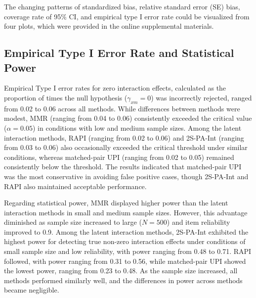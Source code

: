 \documentclass[
  man,mask]{apa6}
\begin{document}
The changing patterns of standardized bias, relative standard error (SE) bias, coverage rate of 95\% CI, and empirical type I error rate could be visualized from four plots, which were provided in the online supplemental materials.

\subsection{Empirical Type I Error Rate and Statistical Power}\label{empirical-type-i-error-rate-and-statistical-power-1}

Empirical Type I error rates for zero interaction effects, calculated as the proportion of times the null hypothesis (\(\gamma_{xm} = 0\)) was incorrectly rejected, ranged from 0.02 to 0.06 across all methods. While differences between methods were modest, MMR (ranging from 0.04 to 0.06) consistently exceeded the critical value (\(\alpha = 0.05\)) in conditions with low and medium sample sizes. Among the latent interaction methods, RAPI (ranging from 0.02 to 0.06) and 2S-PA-Int (ranging from 0.03 to 0.06) also occasionally exceeded the critical threshold under similar conditions, whereas matched-pair UPI (ranging from 0.02 to 0.05) remained consistently below the threshold. The results indicated that matched-pair UPI was the most conservative in avoiding false positive cases, though 2S-PA-Int and RAPI also maintained acceptable performance.

Regarding statistical power, MMR displayed higher power than the latent interaction methods in small and medium sample sizes. However, this advantage diminished as sample size increased to large (\(\textit{N} = 500\)) and item reliability improved to 0.9. Among the latent interaction methods, 2S-PA-Int exhibited the highest power for detecting true non-zero interaction effects under conditions of small sample size and low reliability, with power ranging from 0.48 to 0.71. RAPI followed, with power ranging from 0.31 to 0.56, while matched-pair UPI showed the lowest power, ranging from 0.23 to 0.48. As the sample size increased, all methods performed similarly well, and the differences in power across methods became negligible.
\end{document}
